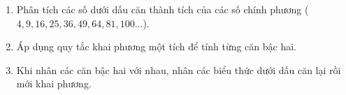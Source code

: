 \begin{enumerate}
\item Phân tích các số dưới dấu căn thành tích của các số chính phương ($4, 9, 16, 25, 36, 49, 64, 81, 100\dots$).
\item Áp dụng quy tắc khai phương một tích để tính từng căn bậc hai.
\item Khi nhân các căn bậc hai với nhau, nhân các biểu thức dưới dấu căn lại rồi mới khai phương.
\end{enumerate}
